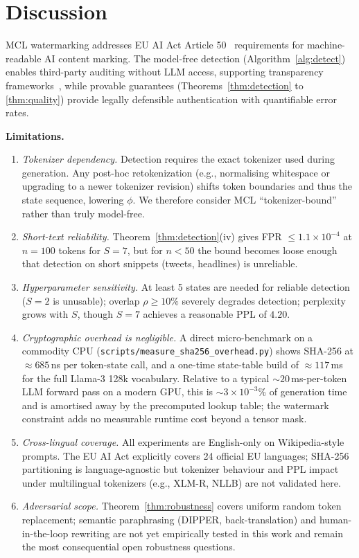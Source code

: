 \documentclass[11pt]{article}
\theoremstyle{definition}
\theoremstyle{remark}
\begin{document}
\section{Discussion}

MCL watermarking addresses EU AI Act Article 50~\cite{euaiact2024} requirements for machine-readable AI content marking. The model-free detection (Algorithm~\ref{alg:detect}) enables third-party auditing without LLM access, supporting transparency frameworks~\cite{oecdhiroshima2024}, while provable guarantees (Theorems~\ref{thm:detection} to \ref{thm:quality}) provide legally defensible authentication with quantifiable error rates.

\textbf{Limitations.}
\begin{enumerate}[label=(\arabic*), itemsep=1pt, topsep=2pt]
    \item \textit{Tokenizer dependency.} Detection requires the exact tokenizer used during generation. Any post-hoc retokenization (e.g., normalising whitespace or upgrading to a newer tokenizer revision) shifts token boundaries and thus the state sequence, lowering $\phi$. We therefore consider MCL ``tokenizer-bound'' rather than truly model-free.
    \item \textit{Short-text reliability.} Theorem~\ref{thm:detection}(iv) gives FPR $\leq 1.1{\times}10^{-4}$ at $n{=}100$ tokens for $S{=}7$, but for $n < 50$ the bound becomes loose enough that detection on short snippets (tweets, headlines) is unreliable.
    \item \textit{Hyperparameter sensitivity.} At least 5 states are needed for reliable detection ($S{=}2$ is unusable); overlap $\rho \geq 10\%$ severely degrades detection; perplexity grows with $S$, though $S{=}7$ achieves a reasonable PPL of $4.20$.
    \item \textit{Cryptographic overhead is negligible.} A direct micro-benchmark on a commodity CPU (\texttt{scripts/measure\_sha256\_overhead.py}) shows SHA-256 at $\approx 685$\,ns per token-state call, and a one-time state-table build of $\approx 117$\,ms for the full Llama-3 128k vocabulary. Relative to a typical $\sim 20$\,ms-per-token LLM forward pass on a modern GPU, this is $\sim 3\times 10^{-3}\%$ of generation time and is amortised away by the precomputed lookup table; the watermark constraint adds no measurable runtime cost beyond a tensor mask.
    \item \textit{Cross-lingual coverage.} All experiments are English-only on Wikipedia-style prompts. The EU AI Act explicitly covers 24 official EU languages; SHA-256 partitioning is language-agnostic but tokenizer behaviour and PPL impact under multilingual tokenizers (e.g., XLM-R, NLLB) are not validated here.
    \item \textit{Adversarial scope.} Theorem~\ref{thm:robustness} covers uniform random token replacement; semantic paraphrasing (DIPPER, back-translation) and human-in-the-loop rewriting are not yet empirically tested in this work and remain the most consequential open robustness questions.
\end{enumerate}
\end{document}

